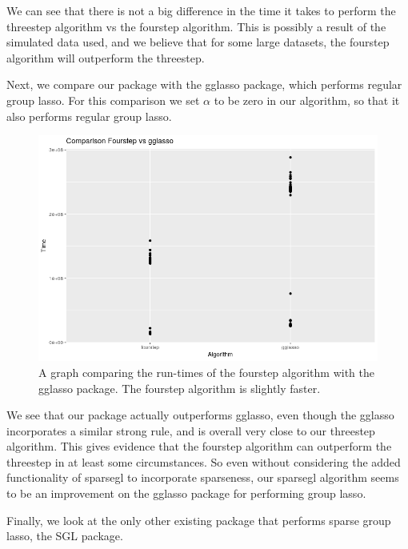 \documentclass[titlepage]{article}
\begin{document}
We can see that there is not a big difference in the time it takes to perform the threestep algorithm vs the fourstep algorithm. This is possibly a result of the simulated data used, and we believe that for some large datasets, the fourstep algorithm will outperform the threestep.

Next, we compare our package with the gglasso package, which performs regular group lasso. For this comparison we set $\alpha$ to be zero in our algorithm, so that it also performs regular group lasso. 

\begin{figure}[tb!]
\centering
\includegraphics[scale=0.5]{fourvsgglasso.png}
\caption{A graph comparing the run-times of the fourstep algorithm with the gglasso package. The fourstep algorithm is slightly faster.}
\label{fig:1fourvsgglasso}
\end{figure}

We see that our package actually outperforms gglasso, even though the gglasso incorporates a similar strong rule, and is overall very close to our threestep algorithm. This gives evidence that the fourstep algorithm can outperform the threestep in at least some circumstances. So even without considering the added functionality of sparsegl to incorporate sparseness, our sparsegl algorithm seems to be an improvement on the gglasso package for performing group lasso.

Finally, we look at the only other existing package that performs sparse group lasso, the SGL package.
\end{document}
